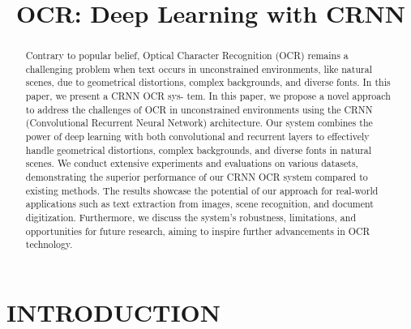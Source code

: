 \documentclass[10pt,twocolumn,letterpaper]{article}
\begin{document}
\title{OCR: Deep Learning with CRNN}


\maketitle

\begin{abstract}
   Contrary to popular belief, Optical Character
Recognition (OCR) remains a challenging problem when text
occurs in unconstrained environments, like natural scenes, due
to geometrical distortions, complex backgrounds, and diverse
fonts. In this paper, we present a CRNN OCR sys-
tem. 
In this paper, we propose a novel approach to address the challenges of OCR in unconstrained environments using the CRNN (Convolutional Recurrent Neural Network) architecture. Our system combines the power of deep learning with both convolutional and recurrent layers to effectively handle geometrical distortions, complex backgrounds, and diverse fonts in natural scenes. We conduct extensive experiments and evaluations on various datasets, demonstrating the superior performance of our CRNN OCR system compared to existing methods. The results showcase the potential of our approach for real-world applications such as text extraction from images, scene recognition, and document digitization. Furthermore, we discuss the system's robustness, limitations, and opportunities for future research, aiming to inspire further advancements in OCR technology.
\end{abstract}

\section{INTRODUCTION}
\label{sec:intro}
\end{document}
